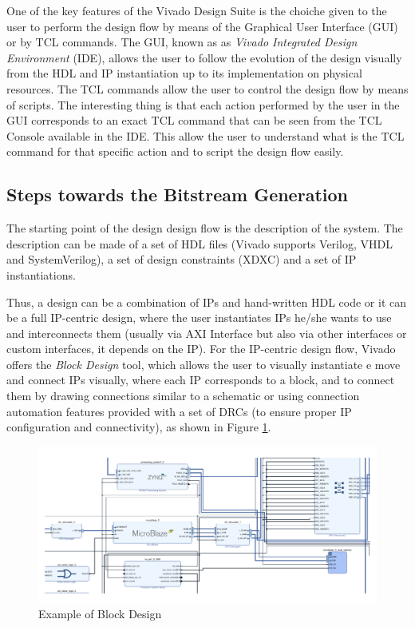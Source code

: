 One of the key features of the Vivado Design Suite is the choiche given to the user to perform the design flow by means of the Graphical User Interface (GUI) or by TCL commands. The GUI, known as as \textit{Vivado Integrated Design Environment} (IDE), allows the user to follow the evolution of the design visually from the HDL and IP instantiation up to its implementation on physical resources. The TCL commands allow the user to control the design flow by means of scripts. The interesting thing is that each action performed by the user in the GUI corresponds to an exact TCL command that can be seen from the TCL Console available in the IDE. This allow the user to understand what is the TCL command for that specific action and to script the design flow easily. 

\subsection{Steps towards the Bitstream Generation}
\label{sec:bitstreamgen}

The starting point of the design design flow is the description of the system. The description can be made of a set of HDL files (Vivado supports Verilog, VHDL and SystemVerilog), a set of design constraints (XDXC) and a set of IP instantiations. \bigskip 

Thus, a design can be a combination of IPs and hand-written HDL code or it can be a full IP-centric design, where the user instantiates IPs he/she wants to use and interconnects them (usually via AXI Interface but also via other interfaces or custom interfaces, it depends on the IP). For the IP-centric design flow, Vivado offers the \textit{Block Design} tool, which allows the user to visually instantiate e move and connect IPs visually, where each IP corresponds to a block, and to connect them by drawing connections similar to a schematic or using connection automation features provided with a set of DRCs (to ensure proper IP configuration and connectivity), as shown in Figure \ref{fig:block_design_example}. \bigskip

\begin{figure}[H]
\centering
\includegraphics[width=0.75\linewidth]{images/chapter3/design_example-cropped.pdf}
\caption{Example of Block Design}
\label{fig:block_design_example}
\end{figure}


